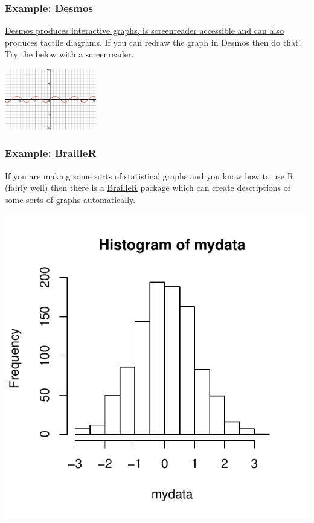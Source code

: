 \documentclass[
  12pt,
  a4paper]{extarticle}
\renewcommand{\;}{\,}
\begin{document}
\hypertarget{example-desmos}{%
\subsubsection{Example: Desmos}\label{example-desmos}}

\href{https://www.desmos.com/accessibility}{Desmos produces interactive graphs, is screenreader accessible and can also produces tactile diagrams}. If you can redraw the graph in Desmos then do that! Try the below with a screenreader.

\includegraphics[width=0.3\textwidth,height=\textheight]{./desmos-sine-graph.png}

\hypertarget{example-brailler}{%
\subsubsection{Example: BrailleR}\label{example-brailler}}

If you are making some sorts of statistical graphs and you know how to use R (fairly well) then there is a \href{https://github.com/ajrgodfrey/BrailleR}{BrailleR} package which can create descriptions of some sorts of graphs automatically.

\includegraphics[width=\Width,height=\Height]{./Figs/myhist2.svg.pdf}
\end{document}
